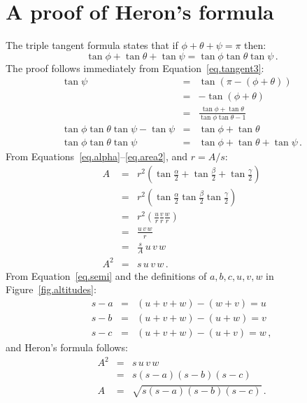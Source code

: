 \section{A proof of Heron's formula}

The triple tangent formula states that if $\phi+\theta+\psi=\pi$ then:
\begin{equation}
\tan\phi+\tan\theta+\tan\psi = \tan\phi\tan\theta\tan\psi\,. \label{eq.triple}
\end{equation}
The proof follows immediately from Equation~\ref{eq.tangent3}:
\begin{eqnarray*}
\tan\psi &=& \tan (\pi-(\phi+\theta))\\
&=& -\tan (\phi+\theta)\\
&=& \frac{\tan\phi+\tan\theta}{\tan\phi\tan\theta-1}\\
\tan\phi\tan\theta\tan\psi-\tan\psi&=& \tan\phi+\tan\theta\\
\tan\phi\tan\theta\tan\psi &=&\tan\phi+\tan\theta+\tan\psi\,.
\end{eqnarray*}
From Equations~\ref{eq.alpha}--\ref{eq.area2}, and $r=A/s$:
\begin{eqnarray*}
A &=& r^2\left(\tan \frac{\alpha}{2}+\tan \frac{\beta}{2}+\tan \frac{\gamma}{2}\right)\\
&=&r^2\left(\tan \frac{\alpha}{2}\tan \frac{\beta}{2}\tan \frac{\gamma}{2}\right)\\
&=&r^2\left(\frac{u}{r}\frac{v}{r}\frac{w}{r}\right)\\
&=&\frac{u\,v\,w}{r}\\
&=&\frac{s}{A}\,u\,v\,w\\
A^2&=&s\,u\,v\,w\,.
\end{eqnarray*}
From Equation~\ref{eq.semi} and the definitions of $a,b,c,u,v,w$ in Figure~\ref{fig.altitudes}:
\begin{eqnarray*}
s - a &=& (u+v+w) - (w+v) = u\\
s - b &=& (u+v+w) - (u+w) = v\\
s - c &=& (u+v+w) - (u+v) = w\,,
\end{eqnarray*}
and Heron's formula follows:
\begin{eqnarray*}
A^2 &=& s\,u\,v\,w\\
&=& s(s-a)(s-b)(s-c)\\
A &=& \sqrt{s(s-a)(s-b)(s-c)}\,.
\end{eqnarray*}


